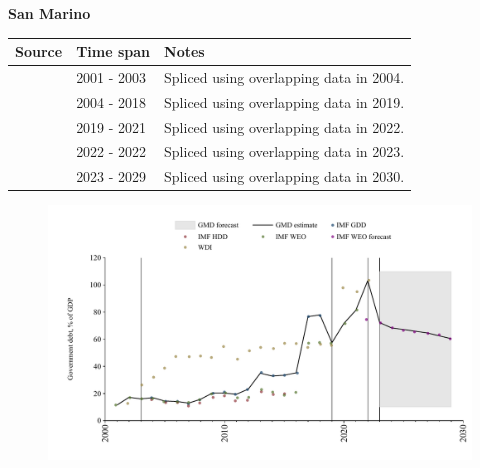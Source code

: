\documentclass[12pt,a4paper,landscape]{article}
\begin{document}
\begin{adjustbox}{max totalsize={\paperwidth}{\paperheight},center}
\begin{minipage}[t][\textheight][t]{\textwidth}
\vspace*{0.5cm}
{}
\begin{center}
{\Large\bfseries San Marino}
\end{center}
\vspace{0.5cm}
\begin{table}[H]
\centering
\small
\begin{tabular}{|l|l|l|}
\hline
\textbf{Source} & \textbf{Time span} & \textbf{Notes} \\
\hline
\rowcolor{white}\cite{IMF_WEO}& 2001 - 2003 &Spliced using overlapping data in 2004.\\
\rowcolor{lightgray}\cite{IMF_GDD}& 2004 - 2018 &Spliced using overlapping data in 2019.\\
\rowcolor{white}\cite{IMF_WEO}& 2019 - 2021 &Spliced using overlapping data in 2022.\\
\rowcolor{lightgray}\cite{WDI}& 2022 - 2022 &Spliced using overlapping data in 2023.\\
\rowcolor{white}\cite{IMF_WEO_forecast}& 2023 - 2029 &Spliced using overlapping data in 2030.\\
\hline
\end{tabular}
\end{table}
\begin{figure}[H]
\centering
\includegraphics[width=\textwidth,height=0.6\textheight,keepaspectratio]{graphs/SMR_govdebt_GDP.pdf}
\end{figure}
\end{minipage}
\end{adjustbox}
\end{document}
